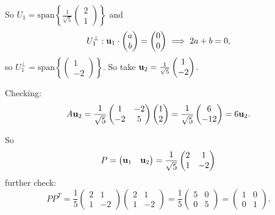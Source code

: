 \documentclass[10pt, a4paper]{article}
\begin{document}
\begin{example}
\begin{solution}
        So $U_1 = \mathrm{span}\left\{\frac{1}{\sqrt{5}}\begin{pmatrix}
            2 \\ 1
        \end{pmatrix}\right\}$ and
        \[
        U_1 ^ {\perp} : \mathbf{u}_1 \cdot \begin{pmatrix}
            a \\ b
        \end{pmatrix} = \begin{pmatrix}
            0 \\ 0
        \end{pmatrix} \implies 2a + b = 0,
        \]
        so $U_1 ^ {\perp} = \mathrm{span}\left\{\begin{pmatrix}
            1 \\ -2
        \end{pmatrix}\right\}$.
        So take $\mathbf{u}_2 = \frac{1}{\sqrt{5}}\begin{pmatrix}
            1 \\ -2
        \end{pmatrix}$.

        Checking:
        \[
        A\mathbf{u}_2 = \frac{1}{\sqrt{5}}\begin{pmatrix}
            1 & -2 \\ -2 & 5
        \end{pmatrix}\begin{pmatrix}
            1 \\ 2
        \end{pmatrix} = \frac{1}{\sqrt{5}}\begin{pmatrix}
            6 \\ -12
        \end{pmatrix} = 6\mathbf{u}_2.
        \]

        So
        \[
        P = \begin{pmatrix}
            \mathbf{u}_1 & \mathbf{u}_2
        \end{pmatrix} = \frac{1}{\sqrt{5}}\begin{pmatrix}
            2 & 1 \\ 1 & -2
        \end{pmatrix}
        \]
        further check:
        \[
        PP ^ T = \frac{1}{5}\begin{pmatrix}
            2 & 1 \\ 1 & -2
        \end{pmatrix}\begin{pmatrix}
            2 & 1 \\ 1 & -2
        \end{pmatrix} = \frac{1}{5}\begin{pmatrix}
            5 & 0 \\ 0 & 5
        \end{pmatrix} = \begin{pmatrix}
            1 & 0 \\ 0 & 1
        \end{pmatrix}.
        \]
    \end{solution}
\end{example}
\end{document}
